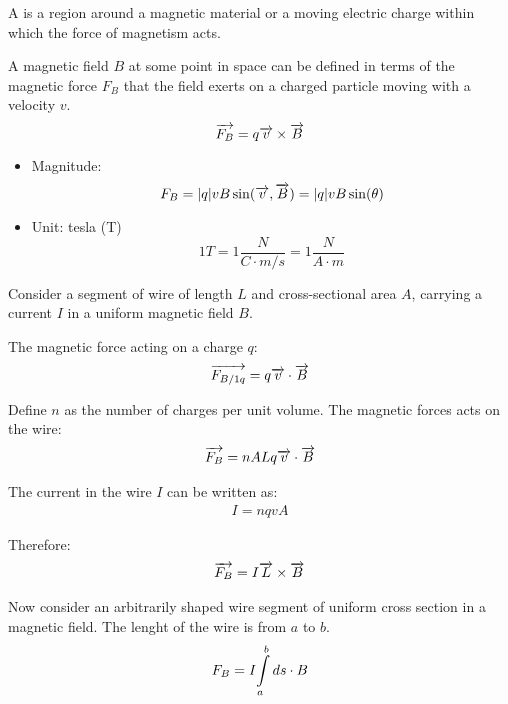         \par A  is a region around a magnetic material or a moving electric
        charge within which the force of magnetism acts.
        \par A magnetic field $B$ at some point in space can be defined in terms of the magnetic
        force $F_{B}$ that the field exerts on a charged particle moving with a velocity $v$.
        \begin{equation}
            \overrightarrow{F_{B}} = q \overrightarrow{v} \times \overrightarrow{B}
        \end{equation}
        \begin{itemize}
            \item Magnitude:
                \begin{equation}
                    F_{B} = |q|vB \sin(\overrightarrow{v}, \overrightarrow{B}) = |q|vB \sin(\theta)
                \end{equation}
            \item Unit: tesla (T)
                \begin{equation}
                    1 T = 1 \frac{N}{C \cdot m/s} = 1 \frac{N}{A \cdot m}
                \end{equation}
        \end{itemize}

    \par Consider a  segment of wire of length $L$ and cross-sectional area $A$,
    carrying a current $I$ in a uniform magnetic field $B$.
    \par The magnetic force acting on a charge $q$:
    \begin{align*}
        \overrightarrow{F_{B/1q}} = q \overrightarrow{v} \cdot \overrightarrow{B}
    \end{align*}
    \par Define $n$ as the number of charges per unit volume. The magnetic forces acts on the
    wire:
    \begin{align*}
        \overrightarrow{F_{B}} = nALq \overrightarrow{v} \cdot \overrightarrow{B} 
    \end{align*}
    \par The current in the wire $I$ can be written as:
    \begin{align*}
        I = nqvA
    \end{align*}
    \par Therefore:
    \begin{align*}
        \overrightarrow{F_{B}} = I \overrightarrow{L} \times \overrightarrow{B}
    \end{align*}
    \par Now consider an arbitrarily shaped wire segment of uniform cross section in a magnetic
    field. The lenght of the wire is from $a$ to $b$.
    \begin{align*}
        F_{B} = I {\int\limits _{a}^{b}ds} \cdot B
    \end{align*}

